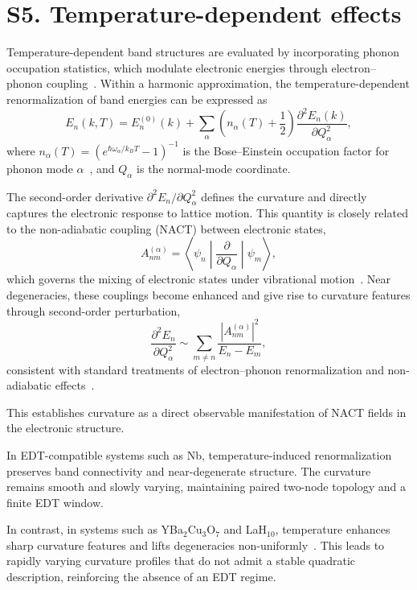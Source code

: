 \documentclass[12pt]{article}
\begin{document}
\section*{S5. Temperature-dependent effects}

Temperature-dependent band structures are evaluated by incorporating phonon occupation statistics, which modulate electronic energies through electron--phonon coupling~\cite{AllenHeine1976,Giustino2017}. Within a harmonic approximation, the temperature-dependent renormalization of band energies can be expressed as
\begin{equation}
E_n(k,T) = E_n^{(0)}(k) + \sum_{\alpha} \left(n_{\alpha}(T) + \frac{1}{2}\right)
\frac{\partial^2 E_n(k)}{\partial Q_\alpha^2},
\end{equation}
where $n_{\alpha}(T) = \left(e^{\hbar \omega_\alpha / k_B T} - 1\right)^{-1}$ is the Bose--Einstein occupation factor for phonon mode $\alpha$~\cite{AshcroftMermin}, and $Q_\alpha$ is the normal-mode coordinate.

The second-order derivative $\partial^2 E_n / \partial Q_\alpha^2$ defines the curvature and directly captures the electronic response to lattice motion. This quantity is closely related to the non-adiabatic coupling (NACT) between electronic states,
\begin{equation}
A_{nm}^{(\alpha)} = \left\langle \psi_n \middle| \frac{\partial}{\partial Q_\alpha} \middle| \psi_m \right\rangle,
\end{equation}
which governs the mixing of electronic states under vibrational motion~\cite{Mead1979,Yarkony1996}. Near degeneracies, these couplings become enhanced and give rise to curvature features through second-order perturbation,
\begin{equation}
\frac{\partial^2 E_n}{\partial Q_\alpha^2}
\sim
\sum_{m \neq n}
\frac{|A_{nm}^{(\alpha)}|^2}{E_n - E_m},
\end{equation}
consistent with standard treatments of electron--phonon renormalization and non-adiabatic effects~\cite{AllenHeine1976,Giustino2017}.

This establishes curvature as a direct observable manifestation of NACT fields in the electronic structure.

In EDT-compatible systems such as Nb, temperature-induced renormalization preserves band connectivity and near-degenerate structure. The curvature remains smooth and slowly varying, maintaining paired two-node topology and a finite EDT window.

In contrast, in systems such as YBa$_2$Cu$_3$O$_7$ and LaH$_{10}$, temperature enhances sharp curvature features and lifts degeneracies non-uniformly~\cite{Pickett1989,Drozdov2019}. This leads to rapidly varying curvature profiles that do not admit a stable quadratic description, reinforcing the absence of an EDT regime.
\end{document}

